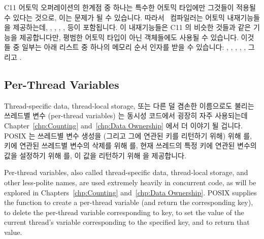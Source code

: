 C11 어토믹 오퍼레이션의 한계점 중 하나는 특수한 어토믹 타입에만 그것들이 적용될
수 있다는 것으로, 이는 문제가 될 수 있습니다.
따라서 \GNUC\ 컴파일러는 어토믹 내재기능들을 제공하는데,
,
,
,
,
 등이 포함됩니다.
이 내재기능들은 C11 의 비슷한 것들과 같은 기능을 제공합니다만, 평범한 어토믹
타입이 아닌 객체들에도 사용될 수 있습니다.
이것들 중 일부는 아래 리스트 중 하나의 메모리 순서 인자를 받을 수 있습니다:
,
,
,
,
, 그리고
.

\subsection{Per-Thread Variables}
\label{sec:toolsoftrade:Per-Thread Variables}

Thread-specific data, thread-local storage, 또는 다른 덜 겸손한 이름으로도
불리는 쓰레드별 변수 (per-thread variables) 는 동시성 코드에서 굉장히 자주
사용되는데
Chapter~\ref{chp:Counting} and~\ref{chp:Data Ownership} 에서 더 이야기 될
겁니다.
POSIX 는 쓰레드별 변수 생성을 (그리고 그에 연관된 키를 리턴하기 위해) 위해
 를, 키에 연관된 쓰레드별 변수의 삭제를 위해
 를, 현재 쓰레드의 특정 키에 연관된 변수의 값을
설정하기 위해  를, 이 값을 리턴하기 위해
 을 제공합니다.

\iffalse

Per-thread variables, also called thread-specific data, thread-local
storage, and other less-polite names, are used extremely
heavily in concurrent code, as will be explored in
Chapters~\ref{chp:Counting} and~\ref{chp:Data Ownership}.
POSIX supplies the  function to create a
per-thread variable (and return the corresponding key),
 to delete the per-thread variable corresponding
to key,
 to set the value of the current thread's
variable corresponding to the specified key,
and  to return that value.

